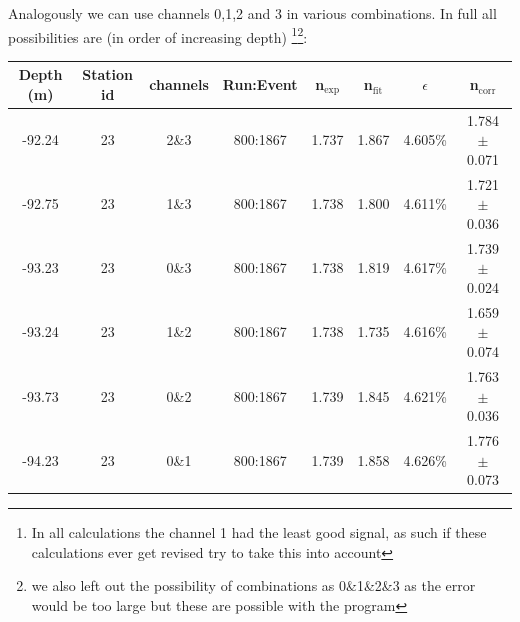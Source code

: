 \documentclass[11pt,a4paper,faculty=we,language=en,doctype=report]{cls/ugent-doc}
\begin{document}
Analogously we can use channels 0,1,2 and 3 in various combinations.
In full all possibilities are (in order of increasing depth)
\footnote{In all calculations the channel 1 had the least good
signal, as such if these calculations ever get revised try to take
this into account}\footnote{we also left out the possibility of
combinations as 0\&1\&2\&3 as the error would be too large
but these are possible with the program}:
\begin{center}
\begin{tabular}{||c c c c c c c c||}
 \hline
 Depth (m) & Station id & channels & Run:Event & n$_\text{exp}$ & n$_\text{fit}$ & $\epsilon$ & n$_\text{corr}$\\ [0.5ex]
 \hline\hline
 -92.24 & 23 & 2\&3 & 800:1867 & 1.737 & 1.867 & 4.605\% & 1.784 $\pm$ 0.071 \\
 -92.75 & 23 & 1\&3 & 800:1867 & 1.738 & 1.800 & 4.611\% & 1.721 $\pm$ 0.036 \\
 -93.23 & 23 & 0\&3 & 800:1867 & 1.738 & 1.819 & 4.617\% & 1.739 $\pm$ 0.024 \\
 -93.24 & 23 & 1\&2 & 800:1867 & 1.738 & 1.735 & 4.616\% & 1.659 $\pm$ 0.074 \\
 -93.73 & 23 & 0\&2 & 800:1867 & 1.739 & 1.845 & 4.621\% & 1.763 $\pm$ 0.036 \\
 -94.23 & 23 & 0\&1 & 800:1867 & 1.739 & 1.858 & 4.626\% & 1.776 $\pm$ 0.073 \\
 \hline
\end{tabular}
\end{center}
\end{document}
